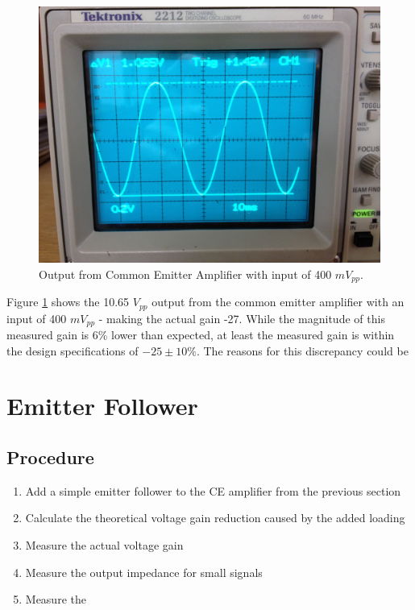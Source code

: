 \documentclass[12pt,letterpaper]{report}
\newlength \figwidth
\begin{document}
\begin{figure}[H]
\centering
\includegraphics[width=\figwidth, keepaspectratio=true]{lab6_images/simple_output.jpg}
\caption{Output from Common Emitter Amplifier with input of 400  $mV_{pp}$.}
\label{fig:simple_output}
\end{figure}

Figure \ref{fig:simple_output} shows the 10.65 $V_{pp}$ output from the common emitter amplifier with an input of 400 $mV_{pp}$ - making the actual gain -27. While the magnitude of this measured gain is 6\% lower than expected, at least the measured gain is within the design specifications of $-25 \pm 10\%$. The reasons for this discrepancy could be 

\section*{Emitter Follower}
\subsection*{Procedure}

\begin{enumerate}
\item Add a simple emitter follower to the CE amplifier from the previous section
\item Calculate the theoretical voltage gain reduction caused by the added loading
\item Measure the actual voltage gain
\item Measure the output impedance for small signals
\item Measure the 
\end{enumerate}
\end{document}
